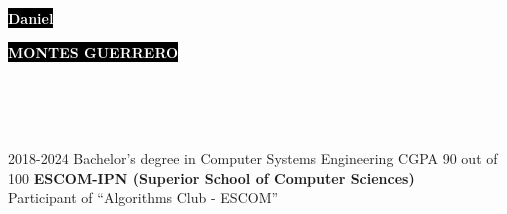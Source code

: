 \documentclass[9pt]{developercv} %
\begin{document}

\begin{minipage}[t]{0.70\textwidth} %
	\vspace{-\baselineskip} %
	
	\colorbox{black}{{\HUGE\textcolor{white}{\textbf{{Daniel}}}}} %
	
	\colorbox{black}{{\HUGE\textcolor{white}{\textbf{{MONTES GUERRERO}}}}} %
	
	\vspace{6pt}
\end{minipage}
\begin{minipage}[t]{0.3\textwidth} %
	\vspace{-\baselineskip} %
	
	\\
	\\
	\\
\end{minipage}



\begin{entrylist}
	\entry
		{2018-2024}
		{Bachelor’s degree in Computer Systems Engineering}
		{CGPA 90 out of 100}
		{\textbf{ESCOM-IPN (Superior School of Computer Sciences)}\\
		Participant of ``Algorithms Club - ESCOM''
		}
\end{entrylist}
\end{document}
